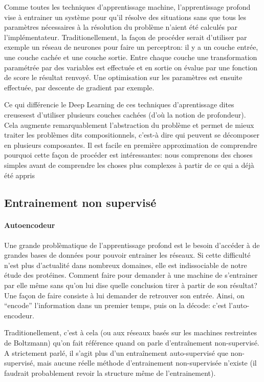 \documentclass[a4paper,11pt]{article}
\begin{document}
Comme toutes les techniques d'apprentissage machine, l'apprentissage profond
vise à entrainer un système pour qu'il résolve des situations sans que tous les
paramètres nécessaires à la résolution du problème n'aient été calculés par
l'implémentateur. Traditionellement, la façon de procéder serait d'utiliser par
exemple un réseau de neurones pour faire un perceptron: il y a un couche entrée,
une couche cachée et une couche sortie. Entre chaque couche une transformation
paramétrée par des variables est effectuée et en sortie on évalue par une
fonction de score le résultat renvoyé. Une optimisation sur les paramètres est
ensuite effectuée, par descente de gradient par exemple.

Ce qui différencie le Deep Learning de ces techniques d'aprentissage dites \og
creuses\fg est d'utiliser plusieurs couches cachées (d'où la notion de
profondeur). Cela augmente remarquablement l'abstraction du problème et permet
de mieux traiter les problèmes dits compositionnels, c'est-à dire qui peuvent se
décomposer en plusieurs composantes. Il est facile en première approximation de
comprendre pourquoi cette façon de procéder est intéressantes: nous comprenons
des choses simples avant de comprendre les choses plus complexes à partir de ce
qui a déjà été appris

\subsection{Entrainement non supervisé}

\paragraph{Autoencodeur}

Une grande problèmatique de l'apprentissage profond est le besoin d'accéder à de
grandes bases de données pour pouvoir entrainer les réseaux. Si cette difficulté
n'est plus d'actualité dans nombreux domaines, elle est indissociable de notre
étude des protéines. Comment faire pour demander à une machine de s'entrainer par elle même sans
qu'on lui dise quelle conclusion tirer à partir de son résultat? Une façon de
faire consiste à lui demander de retrouver son entrée. Ainsi, on ``encode''
l'information dans un premier temps, puis on la décode: c'est l'auto-encodeur.

Traditionellement, c'est à cela (ou aux réseaux basés sur les machines
restreintes de Boltzmann) qu'on fait référence quand on parle d'entraînement
non-supervisé. A strictement parlé, il s'agit plus d'un entraînement
auto-supervisé que non-supervisé, mais aucune réelle méthode d'entrainement
non-supervisée n'existe (il faudrait probablement revoir la structure même de
l'entrainement).
\end{document}
